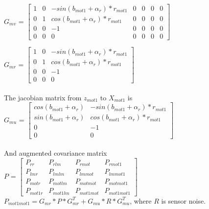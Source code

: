 \documentclass[11pt,a4paper]{article}
\begin{document}
\noindent $G_{mv}$ = $  \begin{bmatrix} 1 & 0 & - sin(b_{mot1}+\alpha_{r})*r_{mot1} & 0 & 0 & 0 & 0\\
                             0 & 1 &  cos(b_{mot1}+\alpha_{r})*r_{mot1}  & 0 & 0 & 0 & 0 \\
							0 & 0 & -1 &  0 & 0 & 0 & 0 \\
							0 & 0  & 0 & 0 &  0 & 0 & 0	                             
                             \end{bmatrix}$

                       
\noindent $G_{mr}$ = $  \begin{bmatrix} 1 & 0 & - sin(b_{mot1}+\alpha_{r})*r_{mot1}\\
                             0 & 1 &  cos(b_{mot1}+\alpha_{r})*r_{mot1} \\
                             0 & 0 & -1 \\
                             0 & 0  & 0 \end{bmatrix}$
\\
\\
\noindent The jacobian matrix from $z_{mot1}$ to $X_{mot1}$ is \\
$G_{mu}$ = $  \begin{bmatrix}  cos(b_{mot1}+\alpha_{r})    & - sin(b_{mot1}+\alpha_{r})*r_{mot1}  \\
                               sin(b_{mot1}+\alpha_{r})  &  cos(b_{mot1}+\alpha_{r})*r_{mot1}   \\
                               0   & -1  \\
                               0  &  0   \end{bmatrix}$
\\
\\
\noindent And augmented covariance matrix\\
 $P$ = $\begin{bmatrix} P_{rr} & P_{rlm} & P_{rmot} & P_{rmot1}\\
										   P_{lmr}& P_{lmlm} & P_{lmmot} & P_{lmmot1}\\
										   P_{motr}& P_{motlm} & P_{motmot} & P_{motmot1}\\ 
										   P_{mot1r}& P_{mot1lm} & P_{mot1mot} & P_{mot1mot1}\end{bmatrix}$  \\                               
$P_{mot1mot1} = G_{mr}*P*G_{mr}^{T} + G_{mu}*R*G_{mu}^{T}$, where $R$ is sensor noise.\\
\end{document}
